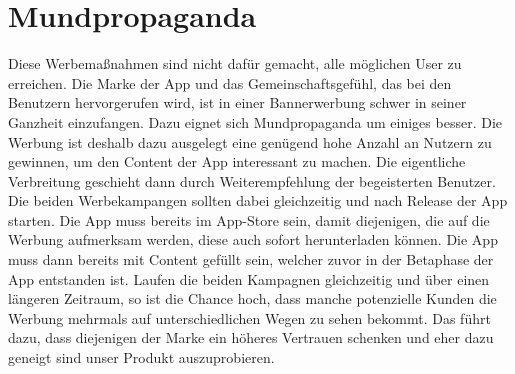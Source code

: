 \section{Mundpropaganda}

Diese Werbemaßnahmen sind nicht dafür gemacht, alle möglichen User zu erreichen. Die Marke der App und das Gemeinschaftsgefühl, das bei den Benutzern hervorgerufen wird, ist in einer Bannerwerbung schwer in seiner Ganzheit einzufangen. Dazu eignet sich Mundpropaganda um einiges besser. Die Werbung ist deshalb dazu ausgelegt eine genügend hohe Anzahl an Nutzern zu gewinnen, um den Content der App interessant zu machen. Die eigentliche Verbreitung geschieht dann durch Weiterempfehlung der begeisterten Benutzer.
Die beiden Werbekampangen sollten dabei gleichzeitig und nach Release der App starten. Die App muss bereits im App-Store sein, damit diejenigen, die auf die Werbung aufmerksam werden, diese auch sofort herunterladen können. Die App muss dann bereits mit Content gefüllt sein, welcher zuvor in der Betaphase der App entstanden ist. Laufen die beiden Kampagnen gleichzeitig und über einen längeren Zeitraum, so ist die Chance hoch, dass manche potenzielle Kunden die Werbung mehrmals auf unterschiedlichen Wegen zu sehen bekommt. Das führt dazu, dass diejenigen der Marke ein höheres Vertrauen schenken und eher dazu geneigt sind unser Produkt auszuprobieren.
